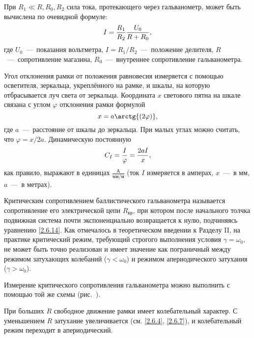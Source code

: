 При $R_1 \ll R, R_0, R_2$ сила тока, протекающего через гальванометр, может 
быть вычислена по очевидной формуле:
\begin{equation}
	\eqmark{2.6.22}
	 I = \frac{R_1}{R_2} \frac{U_0}{R + R_0},
\end{equation}
где $U_0$~---~показания вольтметра, $I = R_1/R_2$~---~положение делителя, 
$R$~---~сопротивление магазина, $R_0$~---~внутреннее сопротивление гальванометра.

Угол отклонения рамки от положения равновесия измеряется с помощью
осветителя, зеркальца, укреплённого на рамке, и шкалы, на которую
отбрасывается луч света от зеркальца. Координата $x$ светового пятна на
шкале связана с углом $\varphi$ отклонения рамки формулой
\begin{equation}
	\eqmark{2.6.23}
	x = a \arctg{(2\varphi)},
\end{equation}
где $a$~---~расстояние от шкалы до зеркальца. При малых углах можно считать,
что $\varphi = x/2a$. Динамическую постоянную
\begin{equation}
	\eqmark{2.6.24}
	C_I = \frac{I}{\varphi} = \frac{2aI}{x},
\end{equation}
как правило, выражают в единицах $\frac{\text{А}}{\text{мм}/\text{м}}$ 
(ток $I$ измеряется в амперах, $x$~---~в мм, $a$~---~в
метрах).


Критическим сопротивлением баллистического гальванометра называется
сопротивление его электрической цепи $R_{\text{кр}}$, при котором после начального
толчка подвижная система почти экспоненциально возвращается к нулю,
подчиняясь уравнению \eqref{2.6.14}. Как отмечалось в теоретическом введении к
Разделу II, на практике критический режим, требующий строгого выполнения
условия $\gamma = \omega_0$, не может быть точно реализован и имеет значение как
пограничный между режимом затухающих колебаний ($\gamma < \omega_0$) и режимом
апериодического затухания ($\gamma > \omega_0$).

Измерение критического сопротивления гальванометра можно выполнить с
помощью той же схемы (рис.~).

При больших $R$ свободное движение рамки имеет колебательный
характер. С уменьшением $R$ затухание увеличивается 
(см. \eqref{2.6.4}, \eqref{2.6.7}), и колебательный режим переходит в апериодический.

